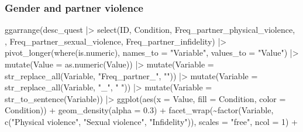 \documentclass[
  bookmarksnumbered]{article}
\newenvironment{Shaded}{\begin{snugshade}}{\end{snugshade}}
\newcommand{\AttributeTok}[1]{\textcolor[rgb]{0.80,0.80,0.80}{#1}}
\newcommand{\DecValTok}[1]{\textcolor[rgb]{0.86,0.86,0.80}{#1}}
\newcommand{\FloatTok}[1]{\textcolor[rgb]{0.75,0.75,0.82}{#1}}
\newcommand{\FunctionTok}[1]{\textcolor[rgb]{0.94,0.94,0.56}{#1}}
\newcommand{\NormalTok}[1]{\textcolor[rgb]{0.80,0.80,0.80}{#1}}
\newcommand{\SpecialCharTok}[1]{\textcolor[rgb]{0.86,0.64,0.64}{#1}}
\newcommand{\StringTok}[1]{\textcolor[rgb]{0.80,0.58,0.58}{#1}}
\begin{document}
\subsubsection{Gender and partner violence}\label{gender-and-partner-violence}

\begin{Shaded}
\begin{Highlighting}[]
\FunctionTok{ggarrange}\NormalTok{(desc\_quest }\SpecialCharTok{|\textgreater{}}
            \FunctionTok{select}\NormalTok{(ID, Condition, Freq\_partner\_physical\_violence,}
\NormalTok{                   , Freq\_partner\_sexual\_violence, Freq\_partner\_infidelity) }\SpecialCharTok{|\textgreater{}}
            \FunctionTok{pivot\_longer}\NormalTok{(}\FunctionTok{where}\NormalTok{(is.numeric),}
                         \AttributeTok{names\_to =} \StringTok{"Variable"}\NormalTok{,}
                         \AttributeTok{values\_to =} \StringTok{"Value"}\NormalTok{) }\SpecialCharTok{|\textgreater{}} 
            \FunctionTok{mutate}\NormalTok{(}\AttributeTok{Value =} \FunctionTok{as.numeric}\NormalTok{(Value)) }\SpecialCharTok{|\textgreater{}} 
            \FunctionTok{mutate}\NormalTok{(}\AttributeTok{Variable =} \FunctionTok{str\_replace\_all}\NormalTok{(Variable, }\StringTok{"Freq\_partner\_"}\NormalTok{, }\StringTok{""}\NormalTok{)) }\SpecialCharTok{|\textgreater{}}
            \FunctionTok{mutate}\NormalTok{(}\AttributeTok{Variable =} \FunctionTok{str\_replace\_all}\NormalTok{(Variable, }\StringTok{"\_"}\NormalTok{, }\StringTok{" "}\NormalTok{)) }\SpecialCharTok{|\textgreater{}}
            \FunctionTok{mutate}\NormalTok{(}\AttributeTok{Variable =} \FunctionTok{str\_to\_sentence}\NormalTok{(Variable)) }\SpecialCharTok{|\textgreater{}} 
            \FunctionTok{ggplot}\NormalTok{(}\FunctionTok{aes}\NormalTok{(}\AttributeTok{x =}\NormalTok{ Value, }\AttributeTok{fill =}\NormalTok{ Condition, }\AttributeTok{color =}\NormalTok{ Condition)) }\SpecialCharTok{+}
            \FunctionTok{geom\_density}\NormalTok{(}\AttributeTok{alpha =} \FloatTok{0.3}\NormalTok{) }\SpecialCharTok{+}
            \FunctionTok{facet\_wrap}\NormalTok{(}\SpecialCharTok{\textasciitilde{}}\FunctionTok{factor}\NormalTok{(Variable, }\FunctionTok{c}\NormalTok{(}\StringTok{"Physical violence"}\NormalTok{,}
                                           \StringTok{"Sexual violence"}\NormalTok{,}
                                           \StringTok{"Infidelity"}\NormalTok{)), }
                       \AttributeTok{scales =} \StringTok{"free"}\NormalTok{, }\AttributeTok{ncol =} \DecValTok{1}\NormalTok{) }\SpecialCharTok{+}

\end{Highlighting}
\end{Shaded}
\end{document}
